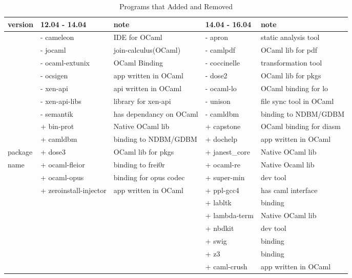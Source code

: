 \documentclass[11pt,a4paper]{article}
\begin{document}
\begin{table}[h,t]
\centering
\begin{tabular}{| l| l |m{3.5cm}|l|m{3.5cm}|}
 \hline
 version & 12.04 - 14.04 & note & 14.04 - 16.04 & note\\
 \hline
        & - cameleon & IDE for OCaml
	& - apron   & static analysis tool	\\
        & - jocaml & join-calculus(OCaml)
	& - camlpdf & OCaml lib for pdf\\
        & - ocaml-extunix & OCaml Binding
        & - coccinelle & transformation tool	\\
        & - ocsigen	& app written in OCaml
	& - dose2	& OCaml lib for pkgs	 \\
        & - xen-api	& api written in OCaml 
	& - ocaml-lo	& OCaml binding for lo 	\\
        & - xen-api-libs& library for xen-api
	& - unison	& file sync tool in OCaml \\
        & - semantik	& has dependancy on OCaml
	& - camldbm	& binding to NDBM/GDBM \\
        & + bin-prot	& Native OCaml lib
	& + capstone	& OCaml binding for diasm\\
        & + camldbm & binding to NDBM/GDBM 
	& + dochelp & app written in OCaml \\
 package& + dose3	& OCaml lib for pkgs
	& + janest\_core& Native OCaml lib \\
    name& + ocaml-fleior& binding to frei0r 
	& + ocaml-re	& Native Ocaml lib\\
        & + ocaml-opus  & binding for opus codec
	& + super-min	& dev tool\\
        & + zeroinstall-injector &  app written in OCaml
        & + ppl-gcc4 & has caml interface	\\
        & & & + labltk & binding	\\
        & & & + lambda-term & Native OCaml lib	\\
        & & & + nbdkit & dev tool\\
        & & & + swig &	binding \\
        & & & + z3 & binding	\\
        & & & + caml-crush & app written in OCaml	\\ 
 \hline

\end{tabular}
\caption{Programs that Added and Removed}
\end{table}
\end{document}
